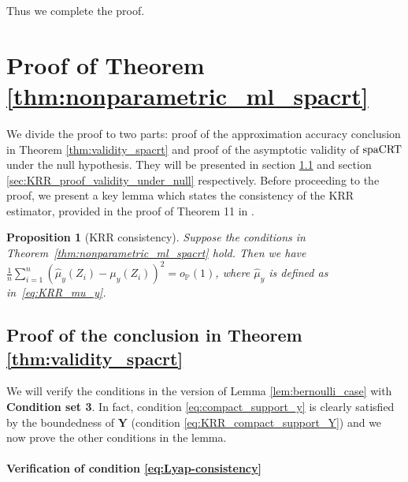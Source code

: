\documentclass[12pt]{article}
\newtheorem{proposition}{Proposition}
\theoremstyle{definition}
\def\P{\mathbb{P}}
\def\P{\mathbb{P}}
\renewcommand{\P}{\mathbb{P}}							%
\newcommand{\srz}{Z}									%
\newcommand{\pry}{{\bm Y}}								%
\newcommand{\spacrt}{\textnormal{spaCRT}}               %
\begin{document}
Thus we complete the proof.



\section{Proof of Theorem \ref{thm:nonparametric_ml_spacrt}}\label{sec:KRR_proof}

We divide the proof to two parts: proof of the approximation accuracy conclusion in Theorem \ref{thm:validity_spacrt} and proof of the asymptotic validity of $\spacrt$ under the null hypothesis. They will be presented in section \ref{sec:KRR_proof_approximation_accuracy} and section \ref{sec:KRR_proof_validity_under_null} respectively. Before proceeding to the proof, we present a key lemma which states the consistency of the KRR estimator, provided in the proof of Theorem 11 in \citet{Shah2018}.

\begin{proposition}[KRR consistency]\label{cor:KRR_consistency}
  Suppose the conditions in Theorem~\ref{thm:nonparametric_ml_spacrt} hold. Then we have $\frac{1}{n}\sum_{i=1}^n (\widehat{\mu}_y(\srz_i)-\mu_y(\srz_i))^2=o_\P(1)$, where $\widehat{\mu}_y$ is defined as in~\eqref{eq:KRR_mu_y}.
\end{proposition}

\subsection{Proof of the conclusion in Theorem \ref{thm:validity_spacrt}}\label{sec:KRR_proof_approximation_accuracy}

We will verify the conditions in the version of Lemma \ref{lem:bernoulli_case} with \textbf{Condition set 3}. In fact, condition \eqref{eq:compact_support_y} is clearly satisfied by the boundedness of $\pry$ (condition \eqref{eq:KRR_compact_support_Y}) and we now prove the other conditions in the lemma.

\paragraph{Verification of condition \eqref{eq:Lyap-consistency}}
\end{document}
